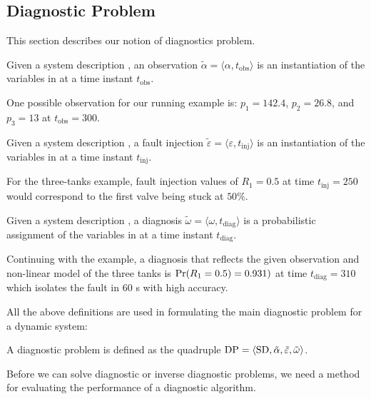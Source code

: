\subsection{Diagnostic Problem}

This section describes our notion of diagnostics problem.
%
\begin{definition}[Observation]
%
Given a system description \sd, an observation $\tilde\alpha =
\langle\alpha, t_{\mathrm{obs}}\rangle$ is an instantiation of the
variables in \obs at a time instant $t_{\mathrm{obs}}$.
%
\end{definition}
%
One possible observation for our running example is:
$p_1 = 142.4$, $p_2 = 26.8$, and $p_3 = 13$ at $t_{\mathrm{obs}} =
300$.
%
\begin{definition}
%
Given a system description \sd, a fault injection $\tilde{\varepsilon}
= \langle\varepsilon, t_{\mathrm{inj}}\rangle$ is an instantiation of
the variables in \comps at a time instant $t_{\mathrm{inj}}$.
%
\end{definition}
%
For the three-tanks example, fault injection values of $R_1 = 0.5$ at
time $t_{\mathrm{inj}} = 250$ would correspond to the first valve
being stuck at $50\%$.
%
\begin{definition}[Diagnosis]\label{def:diagnosis}
%
Given a system description \sd, a diagnosis $\tilde{\omega} =
\langle\omega, t_{\mathrm{diag}}\rangle$ is a probabilistic assignment
of the variables in \comps at a time instant $t_{\mathrm{diag}}$.
%
\end{definition}
%
Continuing with the example, a diagnosis that reflects the given
observation and non-linear model of the three tanks is $\mathrm{Pr}(R_1 = 0.5) =
0.931)$ at time $t_{\mathrm{diag}} = 310$ which isolates the fault in
$60$ s with high accuracy.
\par
All the above definitions are used in formulating the main diagnostic
problem for a dynamic system:
%
\begin{definition}
%
A diagnostic problem \dproblem is defined as the quadruple $\mathrm{DP}
= \langle\mathrm{SD}, \tilde{\alpha}, \tilde{\varepsilon},
\tilde{\omega}\rangle$.
%
\end{definition}
%
Before we can solve diagnostic or inverse diagnostic
problems, we need a method for evaluating the performance of a
diagnostic algorithm.
%

